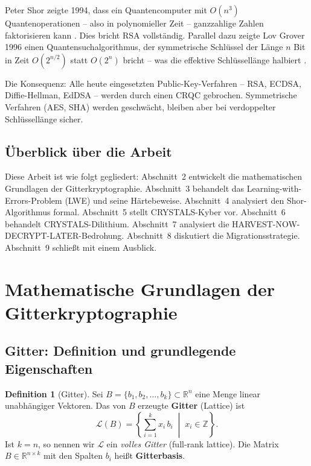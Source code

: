 ﻿\documentclass[a4paper,12pt]{article}
\theoremstyle{definition}
\newtheorem{definition}{Definition}[section]
\begin{document}
Peter Shor zeigte 1994, dass ein Quantencomputer mit $O(n^3)$ Quantenoperationen
-- also in polynomieller Zeit -- ganzzahlige Zahlen faktorisieren kann \cite{Sho94}.
Dies bricht RSA vollständig. Parallel dazu zeigte Lov Grover 1996 einen
Quantensuchalgorithmus, der symmetrische Schlüssel der Länge $n$ Bit in Zeit
$O(2^{n/2})$ statt $O(2^n)$ bricht -- was die effektive Schlüssellänge halbiert
\cite{Gro96}.

Die Konsequenz: Alle heute eingesetzten Public-Key-Verfahren -- RSA, ECDSA,
Diffie-Hellman, EdDSA -- werden durch einen CRQC gebrochen. Symmetrische Verfahren
(AES, SHA) werden geschwächt, bleiben aber bei verdoppelter Schlüssellänge sicher.

\subsection{Überblick über die Arbeit}

Diese Arbeit ist wie folgt gegliedert: Abschnitt~2 entwickelt die mathematischen
Grundlagen der Gitterkryptographie. Abschnitt~3 behandelt das
Learning-with-Errors-Problem (LWE) und seine Härtebeweise. Abschnitt~4 analysiert
den Shor-Algorithmus formal. Abschnitt~5 stellt CRYSTALS-Kyber vor.
Abschnitt~6 behandelt CRYSTALS-Dilithium. Abschnitt~7 analysiert die
HARVEST-NOW-DECRYPT-LATER-Bedrohung. Abschnitt~8 diskutiert die
Migrationsstrategie. Abschnitt~9 schließt mit einem Ausblick.

\section{Mathematische Grundlagen der Gitterkryptographie}

\subsection{Gitter: Definition und grundlegende Eigenschaften}

\begin{definition}[Gitter]
Sei $B = \{b_1, b_2, \ldots, b_k\} \subset \mathbb{R}^n$ eine Menge linear
unabhängiger Vektoren. Das von $B$ erzeugte \textbf{Gitter} (Lattice) ist
\[
  \mathcal{L}(B) = \left\{ \sum_{i=1}^{k} x_i \, b_i \;\middle|\; x_i \in \mathbb{Z} \right\}.
\]
Ist $k = n$, so nennen wir $\mathcal{L}$ ein \emph{volles Gitter} (full-rank lattice).
Die Matrix $B \in \mathbb{R}^{n \times k}$ mit den Spalten $b_i$ heißt
\textbf{Gitterbasis}.
\end{definition}
\end{document}
